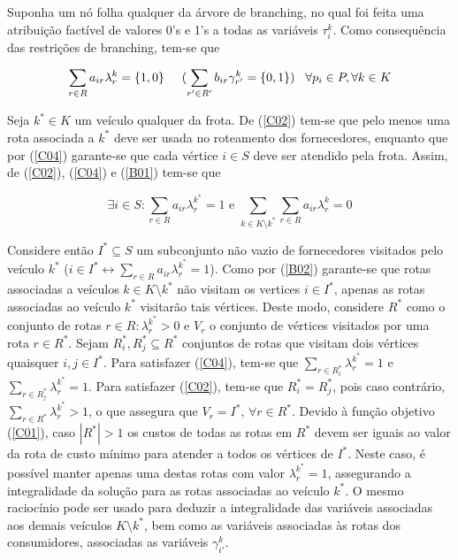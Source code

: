 \documentclass[12pt]{article}
\begin{document}
\noindent Suponha um n\'o folha qualquer da \'arvore de branching, no qual foi feita uma atribui\c{c}\~ao fact\'ivel de valores 0's e 1's a todas as vari\'aveis $\tau^k_i$. Como consequ\^encia das restri\c{c}\~oes de branching, tem-se que

\begin{footnotesize}
\begin{equation}
\label{B01}
\sum\limits_{r \in R} {a_{ir}\lambda^k_r} = \{1,0\} \hspace{5mm} (\sum\limits_{r' \in R'} {b_{ir}\gamma^k_{r'}} = \{0,1\}) \hspace{3mm} \forall p_i \in P,\forall k \in K 
\end{equation}
\end{footnotesize}

\noindent Seja $k^* \in K$ um ve\'iculo qualquer da frota. De (\ref{C02}) tem-se que pelo menos uma rota associada a $k^*$ deve ser usada no roteamento dos fornecedores, enquanto que por (\ref{C04}) garante-se que cada v\'ertice $i \in S$ deve ser atendido pela frota. Assim, de (\ref{C02}), (\ref{C04}) e (\ref{B01}) tem-se que

\begin{footnotesize}
\begin{equation}
\label{B02}
\exists i \in S: \sum\limits_{r \in R} {a_{ir} \lambda^{k^*}_r} = 1 \textrm{ e } \sum\limits_{k \in K \setminus k^*}{\sum\limits_{r \in R} {a_{ir} \lambda^k_r} = 0}
\end{equation}
\end{footnotesize}

\noindent Considere ent\~ao $I^* \subseteq S$ um subconjunto n\~ao vazio de fornecedores visitados pelo ve\'iculo $k^*$ ($i \in I^* \leftrightarrow \sum\limits_{r \in R} {a_{ir} \lambda^{k^*}_r} = 1$). Como por (\ref{B02}) garante-se que rotas associadas a ve\'iculos $k \in K \setminus k^*$ n\~ao visitam os vertices $i \in I^*$, apenas as rotas associadas ao ve\'iculo $k^*$ visitar\~ao tais v\'ertices. Deste modo, considere $R^*$ como o conjunto de rotas $r \in R: \lambda^{k^*}_r > 0$ e $V_r$ o conjunto de v\'ertices visitados por uma rota $r \in R^*$. Sejam $R^*_i, R^*_j \subseteq R^*$ conjuntos de rotas que visitam dois v\'ertices quaisquer $i, j \in I^*$. Para satisfazer (\ref{C04}), tem-se que $\sum\limits_{r \in R^*_i}{\lambda^{k^*}_r} = 1$ e $\sum\limits_{r \in R^*_j}{\lambda^{k^*}_r} = 1$. Para satisfazer (\ref{C02}), tem-se que $R^*_i = R^*_j$, pois caso contr\'ario, $\sum\limits_{r \in R^*} {\lambda^{k^*}_r} > 1$, o que assegura que $V_r = I^*, \, \forall r \in R^*$. Devido \`a fun\c{c}\~ao objetivo (\ref{C01}), caso $|R^*| > 1$ os custos de todas as rotas em $R^*$ devem ser iguais ao valor da rota de custo m\'inimo para atender a todos os v\'ertices de $I^*$. Neste caso, \'e poss\'ivel manter apenas uma destas rotas com valor $\lambda^{k^*}_r = 1$, assegurando a integralidade da solu\c{c}\~ao para as rotas associadas ao ve\'iculo $k^*$. O mesmo racioc\'inio pode ser usado para deduzir a integralidade das vari\'aveis associadas aos demais ve\'iculos $K \setminus k^*$, bem como as vari\'aveis associadas \`as rotas dos consumidores, associadas as vari\'aveis $\gamma^k_{i'}$.
\end{document}
